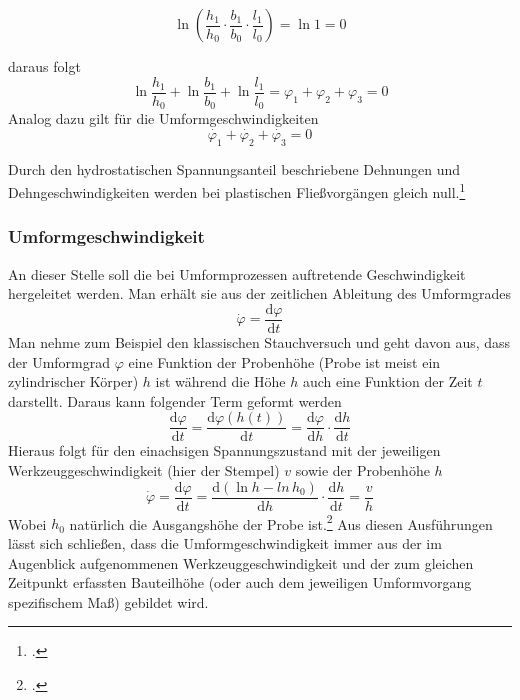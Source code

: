 \documentclass[12pt,a4paper,parskip]{scrartcl}
\begin{document}
{ 
 \begin{equation}\ln (\frac{h_1}{h_0} \cdot \frac{b_1}{b_0} \cdot \frac{l_1}{l_0}) = \ln 1 = 0\end{equation} 
 
daraus folgt \begin{equation}
\ln\frac{h_1}{h_0}+\ln\frac{b_1}{b_0}+\ln\frac{l_1}{l_0}=\varphi_1+\varphi_2+\varphi_3=0
\end{equation}
Analog dazu gilt für die Umformgeschwindigkeiten
\begin{equation}
\dot{\varphi_1}+\dot{\varphi_2}+\dot{\varphi_3}=0
\end{equation}

Durch den hydrostatischen Spannungsanteil beschriebene Dehnungen und Dehngeschwindigkeiten werden bei plastischen Fließvorgängen gleich null.\footcite[Vgl.][24-28]{fu}
\subsubsection{Umformgeschwindigkeit}
An dieser Stelle soll die bei Umformprozessen auftretende Geschwindigkeit hergeleitet werden. Man erhält sie aus der zeitlichen Ableitung des Umformgrades
\begin{equation}
\dot{\varphi} = \frac{\text{d}\varphi}{\text{d}t}
\end{equation}
Man nehme zum Beispiel den klassischen Stauchversuch und geht davon aus, dass der Umformgrad $ \varphi $ eine Funktion der Probenhöhe (Probe ist meist ein zylindrischer Körper) $ h $ ist während die Höhe $ h $ auch eine Funktion der Zeit $ t $ darstellt. Daraus kann folgender Term geformt werden 
\begin{equation}
\frac{\text{d}\varphi}{\text{d}t} = \frac{\text{d} \varphi (h(t))}{\text{d}t}= \frac{\text{d}\varphi}{\text{d}h} \cdot \frac{\text{d}h}{\text{d}t}
\end{equation}
Hieraus folgt für den einachsigen Spannungszustand mit der jeweiligen Werkzeuggeschwindigkeit (hier der Stempel) $ v $ sowie der Probenhöhe $ h $
\begin{equation}
\dot{\varphi}=\frac{\text{d}\varphi}{\text{d}t}= \frac{\text{d}(\ln h - ln  \, h_0)}{\text{d}h}\cdot \frac{\text{d}h}{\text{d}t} = \frac{v}{h}
\end{equation}
Wobei $ h_0 $ natürlich die Ausgangshöhe der Probe ist.\footcite[Vgl.][65]{hu}
Aus diesen Ausführungen lässt sich schließen,  dass die Umformgeschwindigkeit immer aus der im Augenblick aufgenommenen Werkzeuggeschwindigkeit und der zum gleichen Zeitpunkt erfassten Bauteilhöhe (oder auch dem jeweiligen Umformvorgang spezifischem   Maß) gebildet wird.
}
\end{document}
